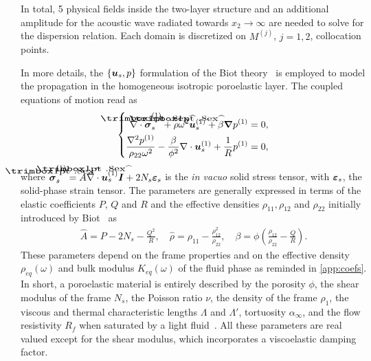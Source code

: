 
In total, 5 physical fields inside the two-layer structure and an additional amplitude for the acoustic wave radiated towards $x_2 \rightarrow \infty $ are needed to solve for the dispersion relation. Each domain is discretized on $M^{(j)}$, $j=1,2$, collocation points.

In more details, the $\{\boldsymbol u_s, p\}$ formulation of the Biot theory~\cite{atalla1998} is employed to model the propagation in the homogeneous isotropic poroelastic layer. The coupled equations of motion read as
    \begin{equation}
        \left\{
        \begin{aligned}
            \nabla \cdot \mbf{\hat{\sigma}}_s^{(1)} + \hat \rho \omega^2 \mbf u_s^{(1)} +  \beta \mbf \nabla p^{(1)} &= 0, \\
            \frac{\nabla^2 p^{(1)}}{\rho_{22} \omega^2} - \frac{\beta}{\phi^2} \nabla \cdot \mbf u_s^{(1)} + \frac{1}{ R}p^{(1)} &= 0,
        \end{aligned}
        \right.
        \label{eq:up_motion_equations}
    \end{equation}
    where $\mbf{\hat{\sigma}}_s^{(1)} = \hat A \nabla \cdot \mbf u_s^{(1)} \mbf I + 2 N_s \mbf \varepsilon_s$ is the \emph{in vacuo} solid stress tensor, with $\boldsymbol \varepsilon_s$, the solid-phase strain tensor. The parameters are generally expressed in terms of the elastic coefficients $ P$,  $Q$ and $ R$ and the effective densities $\rho_{11}, \rho_{12}$ and $ \rho_{22}$ initially introduced by Biot~\cite{biot1956,allard2009} as
    \begin{equation}
        \begin{split}
             \hat A = P-2N_s - \frac{ Q^2}{ R}, \quad \hat \rho = \rho_{11} - \frac{ \rho_{12}^2}{ \rho_{22}},
            \quad \beta = \phi \left( \frac{ \rho_{12}}{ \rho_{22}} - \frac{ Q}{ R} \right).
        \end{split}\label{eq:biot_coefs}
    \end{equation}
These parameters depend on the frame properties and on the effective density ${\rho}_{eq}(\omega)$ and bulk modulus ${K}_{eq}(\omega)$ of the fluid phase as reminded in \ref{app:coefs}. In short, a poroelastic material is entirely described by the porosity $\phi$, the shear modulus of the frame $N_s$, the Poisson ratio $\nu$, the density of the frame $\rho_1$, the viscous and thermal characteristic lengths $\Lambda$ and $\Lambda'$, tortuosity $\alpha_\infty$, and the flow resistivity $R_f$ when saturated by a light fluid~\cite{biot1956,johnson1987,champoux1991}. All these parameters are real valued except for the shear modulus, which incorporates a viscoelastic damping factor.\\
    
